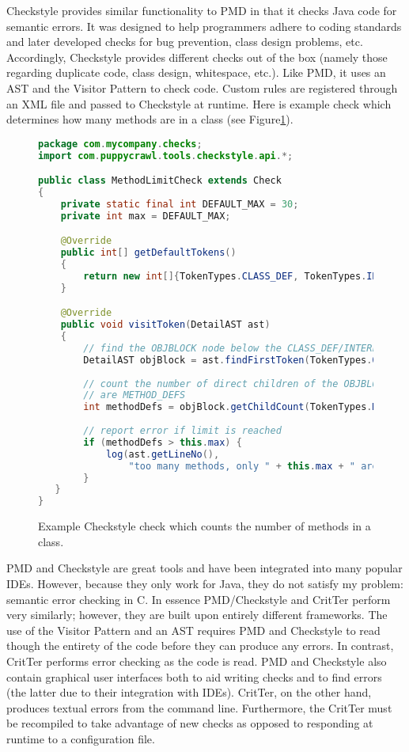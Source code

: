 \documentclass[12pt]{report}
\def\lstlistingname{Figure}
\newcommand{\refCode}{\lstlistingname \hspace{1mm}}
\newcommand{\programName}{CritTer\xspace}
\begin{document}
Checkstyle provides similar functionality to PMD in that it checks Java code for semantic errors.  It was 
designed to help programmers adhere to coding standards and later developed checks for bug 
prevention, class design problems, etc. Accordingly, Checkstyle provides different checks out of the box 
(namely those regarding duplicate code, class design, whitespace, etc.). Like PMD, it uses an AST and 
the Visitor Pattern to check code. Custom rules are registered through an XML file and passed to 
Checkstyle at runtime. Here is example check which determines how many methods are in a class (see 
\refCode \ref{checkstyle-rule}).

\begin{figure}
\begin{lstlisting}[language=Java]
package com.mycompany.checks;
import com.puppycrawl.tools.checkstyle.api.*;

public class MethodLimitCheck extends Check
{
    private static final int DEFAULT_MAX = 30;
    private int max = DEFAULT_MAX;

    @Override
    public int[] getDefaultTokens()
    {
        return new int[]{TokenTypes.CLASS_DEF, TokenTypes.INTERFACE_DEF};
    }

    @Override
    public void visitToken(DetailAST ast)
    {
        // find the OBJBLOCK node below the CLASS_DEF/INTERFACE_DEF
        DetailAST objBlock = ast.findFirstToken(TokenTypes.OBJBLOCK);
        
        // count the number of direct children of the OBJBLOCK that 
        // are METHOD_DEFS
        int methodDefs = objBlock.getChildCount(TokenTypes.METHOD_DEF);
        
        // report error if limit is reached
        if (methodDefs > this.max) {
            log(ast.getLineNo(),
                "too many methods, only " + this.max + " are allowed");
        }
   }
}
\end{lstlisting}
\caption[Example Checkstyle Check]{Example Checkstyle check which counts the number of methods in a class.}
\label{checkstyle-rule}
\end{figure}

PMD and Checkstyle are great tools and have been integrated into many popular IDEs. However, 
because they only work for Java, they do not satisfy my problem: semantic error checking in C. In 
essence PMD/Checkstyle and \programName perform very similarly; however, they are built upon 
entirely different frameworks. The use of the Visitor Pattern and an AST requires PMD and Checkstyle to 
read though the entirety of the code before they can produce any errors. In contrast, \programName 
performs error checking as the code is read. PMD and Checkstyle also contain graphical user interfaces 
both to aid writing checks and to find errors (the latter due to their integration with IDEs). \programName, 
on the other hand, produces textual errors from the command line. Furthermore, the \programName must 
be recompiled to take advantage of new checks as opposed to responding at runtime to a configuration 
file.
\end{document}
